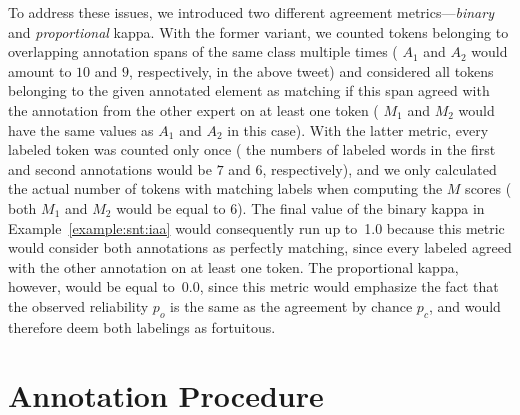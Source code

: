 To address these issues, we introduced two different agreement
metrics---\emph{binary} and \emph{proportional} kappa.  With the
former variant, we counted tokens belonging to overlapping annotation
spans of the same class multiple times (\ie{} $A_1$ and $A_2$ would
amount to $10$ and $9$, respectively, in the above tweet) and
considered all tokens belonging to the given annotated element as
matching if this span agreed with the annotation from the other expert
on at least one token (\ie{} $M_1$ and $M_2$ would have the same
values as $A_1$ and $A_2$ in this case).  With the latter metric,
every labeled token was counted only once (\ie{} the numbers of
labeled words in the first and second annotations would be $7$ and
$6$, respectively), and we only calculated the actual number of tokens
with matching labels when computing the $M$ scores (\ie{} both $M_1$
and $M_2$ would be equal to $6$).  The final value of the binary kappa
in Example~\ref{example:snt:iaa} would consequently run up to~1.0
because this metric would consider both annotations as perfectly
matching, since every labeled  agreed with the
other annotation on at least one token.  The proportional kappa,
however, would be equal to~0.0, since this metric would emphasize the
fact that the observed reliability $p_o$ is the same as the agreement
by chance $p_c$, and would therefore deem both labelings as
fortuitous.

\section{Annotation Procedure}\label{sec:astages}

